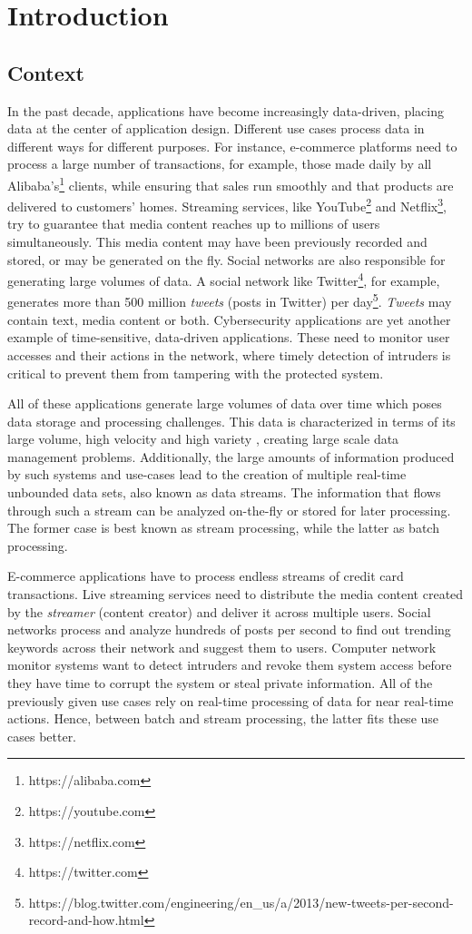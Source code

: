 \chapter{Introduction} \label{chap:intro} \minitoc

\section{Context} \label{sec:context}
In the past decade, applications have become increasingly data-driven, placing data at the center of application design. Different use cases process data in different ways for different purposes. For instance, e-commerce platforms need to process a large number of transactions, for example, those made daily by all Alibaba's\footnote{https://alibaba.com} clients, while ensuring that sales run smoothly and that products are delivered to customers' homes. Streaming services, like YouTube\footnote{https://youtube.com} and Netflix\footnote{https://netflix.com}, try to guarantee that media content reaches up to millions of users simultaneously. This media content may have been previously recorded and stored, or may be generated on the fly. Social networks are also responsible for generating large volumes of data. A social network like Twitter\footnote{https://twitter.com}, for example, generates more than 500 million \textit{tweets} (posts in Twitter) per day\footnote{https://blog.twitter.com/engineering/en\_us/a/2013/new-tweets-per-second-record-and-how.html}. \textit{Tweets} may contain text, media content or both. Cybersecurity applications are yet another example of time-sensitive, data-driven applications. These need to monitor user accesses and their actions in the network, where timely detection of intruders is critical to prevent them from tampering with the protected system.

All of these applications generate large volumes of data over time which poses data storage and processing challenges. This data is characterized in terms of its large volume, high velocity and high variety \cite{Mavragani-GoogleTrends-SLR}, creating large scale data management problems. Additionally, the large amounts of information produced by such systems and use-cases lead to the creation of multiple real-time unbounded data sets, also known as data streams. The information that flows through such a stream can be analyzed on-the-fly or stored for later processing. The former case is best known as stream processing, while the latter as batch processing. 

E-commerce applications have to process endless streams of credit card transactions. Live streaming services need to distribute the media content created by the \textit{streamer} (content creator) and deliver it across multiple users. Social networks process and analyze hundreds of posts per second to find out trending keywords across their network and suggest them to users. Computer network monitor systems want to detect intruders and revoke them system access before they have time to corrupt the system or steal private information. All of the previously given use cases rely on real-time processing of data for near real-time actions. Hence, between batch and stream processing, the latter fits these use cases better.

